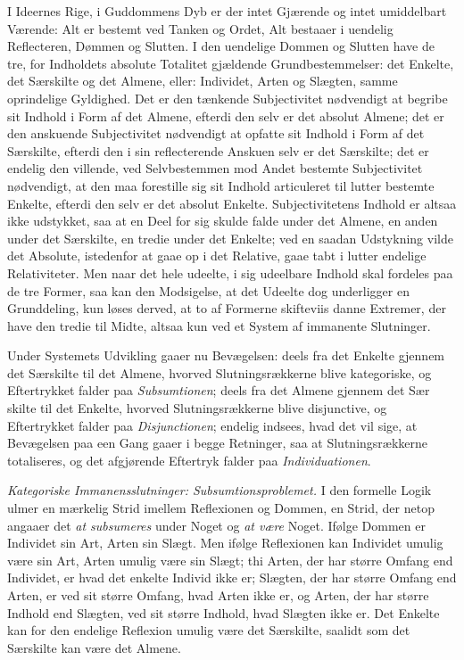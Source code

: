 \documentclass[12pt]{book}
\newcommand{\opage}[1]{\marginnote{\footnotesize\textit{[#1]}}}
\begin{document}
I Ideernes Rige, i Guddommens Dyb er der intet Gjærende og intet umiddelbart Værende: Alt er bestemt ved Tanken og Ordet, Alt bestaaer i uendelig Reflecteren, Dømmen og Slutten. I den uendelige Dommen og Slutten have de tre, for Indholdets absolute Totalitet gjældende Grundbestemmelser: det Enkelte, det Særskilte og det Almene, eller: Individet, Arten og Slægten, samme oprindelige Gyldighed. Det er den tænkende Subjectivitet nødvendigt at begribe sit Indhold i Form af det Almene, efterdi den selv er det absolut Almene; det er den anskuende Subjectivitet nødvendigt at opfatte sit Indhold i Form af det Særskilte, efterdi den i sin reflecterende Anskuen selv er det Særskilte; det er endelig den villende, ved Selvbestemmen mod Andet bestemte Subjectivitet nødvendigt, at den maa forestille sig sit Indhold articuleret til lutter bestemte Enkelte, efterdi den selv er det absolut Enkelte. Subjectivitetens Indhold er altsaa ikke udstykket, saa at en Deel for sig skulde falde under det Almene, en anden under det Særskilte, en tredie under det Enkelte; ved en saadan Udstykning vilde det Absolute, istedenfor at gaae op i det Relative, gaae tabt i lutter endelige Relativiteter. Men naar det hele udeelte, i sig udeelbare Indhold skal fordeles paa de tre Former, saa kan den Modsigelse, at det Udeelte dog underligger en Grunddeling, kun løses derved, at to af Formerne skifteviis danne Extremer, der have den tredie til Midte, altsaa kun ved et System af immanente Slutninger.

Under Systemets Udvikling gaaer nu Bevægelsen: deels fra det Enkelte gjennem det Særskilte til det Almene, hvorved Slutningsrækkerne blive kategoriske, og Eftertrykket falder paa \emph{Subsumtionen}; deels fra det Almene gjennem det Sær%
\opage{347}skilte til det Enkelte, hvorved Slutningsrækkerne blive disjunctive, og Eftertrykket falder paa \emph{Disjunctionen}; endelig indsees, hvad det vil sige, at Bevægelsen paa een Gang gaaer i begge Retninger, saa at Slutningsrækkerne totaliseres, og det afgjørende Eftertryk falder paa \emph{Individuationen}.

\emph{Kategoriske Immanensslutninger: Subsumtionsproblemet.} I den formelle Logik ulmer en mærkelig Strid imellem Reflexionen og Dommen, en Strid, der netop angaaer det \emph{at subsumeres} under Noget og \emph{at være} Noget. Ifølge Dommen er Individet sin Art, Arten sin Slægt. Men ifølge Reflexionen kan Individet umulig være sin Art, Arten umulig være sin Slægt; thi Arten, der har større Omfang end Individet, er hvad det enkelte Individ ikke er; Slægten, der har større Omfang end Arten, er ved sit større Omfang, hvad Arten ikke er, og Arten, der har større Indhold end Slægten, ved sit større Indhold, hvad Slægten ikke er. Det Enkelte kan for den endelige Reflexion umulig være det Særskilte, saalidt som det Særskilte kan være det Almene.
\end{document}
